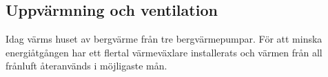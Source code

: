 \subsection{Uppvärmning och ventilation}
Idag värms huset av bergvärme från tre bergvärmepumpar. För att minska energiåtgången har ett flertal värmeväxlare installerats och värmen från all frånluft återanvänds i möjligaste mån.
